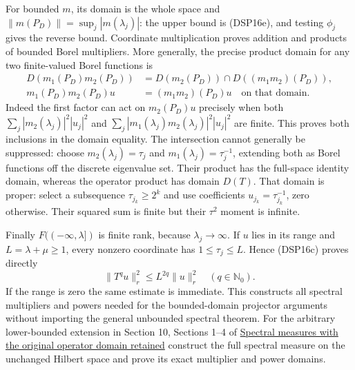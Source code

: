 \documentclass[
  11pt,
]{article}
\makeatletter
\let\ReaderOriginalAnchorStart\hyper@anchorstart
\let\ReaderOriginalAnchorEnd\hyper@anchorend
\let\ReaderPendingAliases\@empty
\def\ReaderArmAliases#1{\gdef\ReaderPendingAliases{#1}}
\def\hyper@anchorstart#1{\ReaderIfNativeAnchorTF{#1}{\ReaderPendingAliases\global\let\ReaderPendingAliases\@empty}{}\ReaderOriginalAnchorStart{#1}}
\makeatother
\begin{document}
For bounded \(m\), its domain is the whole space and
\(\|m(P_D)\|=\sup_j|m(\lambda_j)|\): the upper bound is (DSP16e), and
testing \(\phi_j\) gives the reverse bound. Coordinate multiplication
proves addition and products of bounded Borel multipliers. More
generally, the precise product domain for any two finite-valued Borel
functions is \[
\begin{aligned}
 D(m_1(P_D)m_2(P_D))
 &=D(m_2(P_D))\cap D((m_1m_2)(P_D)),\\
 m_1(P_D)m_2(P_D)u&=(m_1m_2)(P_D)u
 \quad\text{on that domain}.
\end{aligned}
 \tag{DSP16f}
\] Indeed the first factor can act on \(m_2(P_D)u\) precisely when
both\\
\(\sum_j|m_2(\lambda_j)|^2|u_j|^2\) and
\(\sum_j|m_1(\lambda_j)m_2(\lambda_j)|^2|u_j|^2\) are finite. This
proves both inclusions in the domain equality. The intersection cannot
generally be suppressed: choose \(m_2(\lambda_j)=\tau_j\) and
\(m_1(\lambda_j)=\tau_j^{-1}\), extending both as Borel functions off
the discrete eigenvalue set. Their product has the full-space identity
domain, whereas the operator product has domain \(D(T)\). That domain is
proper: select a subsequence \(\tau_{j_k}\geq2^k\) and use coefficients
\(u_{j_k}=\tau_{j_k}^{-1}\), zero otherwise. Their squared sum is finite
but their \(\tau^2\) moment is infinite.

Finally \(F(({-\infty},\lambda])\) is finite rank, because
\(\lambda_j\to\infty\). If \(u\) lies in its range and
\(L=\lambda+\mu\geq1\), every nonzero coordinate has
\(1\leq\tau_j\leq L\). Hence (DSP16c) proves directly \[
 \|T^qu\|_r^2\leq L^{2q}\|u\|_r^2
 \quad(q\in\mathbb N_0).
 \tag{DSP16g}
\] If the range is zero the same estimate is immediate. This constructs
all spectral multipliers and powers needed for the bounded-domain
projector arguments without importing the general unbounded spectral
theorem. For the arbitrary lower-bounded extension in Section 10,
Sections 1--4 of \href{lower-bounded-spectral-calculus.pdf}{Spectral
measures with the original operator domain retained} construct the full
spectral measure on the unchanged Hilbert space and prove its exact
multiplier and power domains.

\ReaderArmAliases{\ReaderOriginalAnchorStart{AN03-DSP-006}\ReaderOriginalAnchorEnd\begingroup\expandafter\def\csname @currentHref\endcsname{AN03-DSP-006}\label{AN03-DSP-006}\endgroup\ReaderOriginalAnchorStart{an03-dsp-006-weighted-projector-kernels}\ReaderOriginalAnchorEnd\begingroup\expandafter\def\csname @currentHref\endcsname{an03-dsp-006-weighted-projector-kernels}\label{an03-dsp-006-weighted-projector-kernels}\endgroup\ReaderOriginalAnchorStart{6-weighted-projector-kernels}\ReaderOriginalAnchorEnd\begingroup\expandafter\def\csname @currentHref\endcsname{6-weighted-projector-kernels}\label{6-weighted-projector-kernels}\endgroup\ReaderOriginalAnchorStart{weighted-projector-kernels}\ReaderOriginalAnchorEnd}
\end{document}
